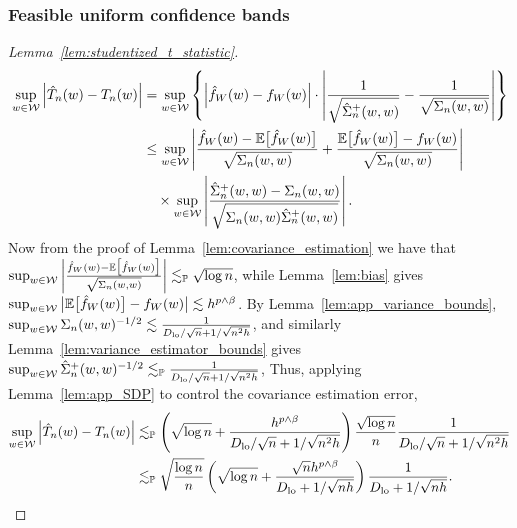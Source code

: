 \subsubsection{Feasible uniform confidence bands}

\begin{proof}[Lemma~\ref{lem:studentized_t_statistic}]

  \begin{align*}
    \sup_{w \in \mathcal{W}}
    \left| \hat T_n(w) - T_n(w) \right|
    &=
    \sup_{w \in \mathcal{W}}
    \left\{
    \left|
    \hat f_W(w) - f_W(w)
    \right|
    \cdot
    \left|
    \frac{1}
    {\sqrt{\hat\Sigma_n^+(w,w)}}
    -
    \frac{1}{\sqrt{\Sigma_n(w,w)}}
    \right|
    \right\} \\
    &\leq
    \sup_{w \in \mathcal{W}}
    \left|
    \frac{\hat f_W(w) - \mathbb{E}\big[\hat f_W(w)\big]}
    {\sqrt{\Sigma_n(w,w)}}
    + \frac{\mathbb{E}\big[\hat f_W(w)\big] - f_W(w)}
    {\sqrt{\Sigma_n(w,w)}}
    \right| \\
    &\quad\times
    \sup_{w \in \mathcal{W}}
    \left|
    \frac{\hat\Sigma_n^+(w,w) - \Sigma_n(w,w)}
    {\sqrt{\Sigma_n(w,w) \hat\Sigma_n^+(w,w)}}
    \right|.
  \end{align*}
  Now from the proof of Lemma~\ref{lem:covariance_estimation} we have that
  $\sup_{w \in \mathcal{W}} \left|
  \frac{\hat f_W(w) - \mathbb{E}\big[\hat f_W(w)\big]}
  {\sqrt{\Sigma_n(w,w)}} \right|
  \lesssim_{\mathbb{P}} \sqrt{\log n}$,
  while Lemma~\ref{lem:bias} gives
  $\sup_{w \in \mathcal{W}} \big| \mathbb{E}\big[\hat f_W(w)\big] - f_W(w) \big|
  \lesssim h^{p \wedge \beta}$.
  By Lemma~\ref{lem:app_variance_bounds},
  $\sup_{w \in \mathcal{W}} \Sigma_n(w,w)^{-1/2}
  \lesssim \frac{1}{D_{\textup{lo}}/\sqrt{n} + 1/\sqrt{n^2h}}$,
  and similarly Lemma~\ref{lem:variance_estimator_bounds} gives
  $\sup_{w \in \mathcal{W}} \hat \Sigma_n^+(w,w)^{-1/2}
  \lesssim_{\mathbb{P}} \frac{1}{D_{\textup{lo}}/\sqrt{n} + 1/\sqrt{n^2h}}$,
  Thus, applying Lemma~\ref{lem:app_SDP} to control the
  covariance estimation error,
  \begin{align*}
    \sup_{w \in \mathcal{W}}
    \left| \hat T_n(w) - T_n(w) \right|
    &\lesssim_{\mathbb{P}}
    \left(
      \sqrt{\log n} + \frac{h^{p \wedge \beta}}{D_{\textup{lo}}/\sqrt{n} + 1/\sqrt{n^2h}}
    \right)
    \frac{\sqrt{\log n}}{n}
    \frac{1}{D_{\textup{lo}}/\sqrt{n} + 1/\sqrt{n^2h}} \\
    &\lesssim_{\mathbb{P}}
    \sqrt{\frac{\log n}{n}}
    \left(
      \sqrt{\log n} + \frac{\sqrt n h^{p \wedge \beta}}
      {D_{\textup{lo}} + 1/\sqrt{nh}}
    \right)
    \frac{1}{D_{\textup{lo}} + 1/\sqrt{nh}}.
  \end{align*}
\end{proof}

